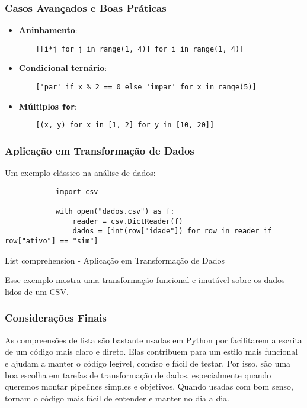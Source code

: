 \documentclass[date,twocolumn,a4paper]{ppgem}
\begin{document}
    \subsubsection{Casos Avançados e Boas Práticas}
    \begin{itemize}
    \item \textbf{Aninhamento}:
    \begin{verbatim}
    [[i*j for j in range(1, 4)] for i in range(1, 4)]
    \end{verbatim}
    \item \textbf{Condicional ternário}:
    \begin{verbatim}
    ['par' if x % 2 == 0 else 'impar' for x in range(5)]
    \end{verbatim}
    \item \textbf{Múltiplos \texttt{for}}:
    \begin{verbatim}
    [(x, y) for x in [1, 2] for y in [10, 20]]
    \end{verbatim}
    \end{itemize}

    \subsubsection{Aplicação em Transformação de Dados}
    Um exemplo clássico na análise de dados:

    \begin{listing}[!ht]
        \begin{verbatim}
            import csv

            with open("dados.csv") as f:
                reader = csv.DictReader(f)
                dados = [int(row["idade"]) for row in reader if row["ativo"] == "sim"]
        \end{verbatim}
        \caption{List comprehension - Aplicação em Transformação de Dados}
        \label{listing:2}
    \end{listing}

    Esse exemplo mostra uma transformação funcional e imutável sobre os dados lidos de um CSV.

    \subsubsection{Considerações Finais}
    As compreensões de lista são bastante usadas em Python por facilitarem a escrita de um código mais claro e direto. Elas contribuem para um estilo mais funcional e ajudam a manter o código legível, conciso e fácil de testar. Por isso, são uma boa escolha em tarefas de transformação de dados, especialmente quando queremos montar pipelines simples e objetivos. Quando usadas com bom senso, tornam o código mais fácil de entender e manter no dia a dia.
\end{document}
